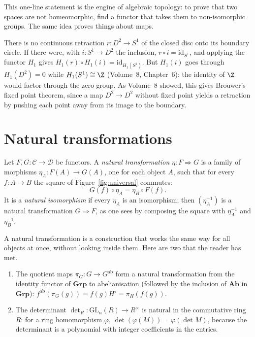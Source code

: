 This one-line statement is the engine of algebraic topology: to prove that two spaces are not homeomorphic, find a functor that takes them to non-isomorphic groups. The same idea
proves things about maps.

\begin{example}\label{ex:brouwer}
There is no continuous retraction $r\colon D^2\to S^1$ of the closed disc onto its boundary circle. If there were, with $i\colon S^1\to D^2$ the inclusion, $r\circ i=\mathrm{id}_{S^1}$, and applying
the functor $H_1$ gives $H_1(r)\circ H_1(i)=\mathrm{id}_{H_1(S^1)}$. But $H_1(i)$ goes through $H_1(D^2)=0$ while $H_1(S^1)\cong\Z$ (Volume~8, Chapter~6): the identity of $\Z$ would factor through
the zero group. As Volume~8 showed, this gives Brouwer's fixed point theorem, since a map $D^2\to D^2$ without fixed point yields a retraction by pushing each point away from its image to the boundary.
\end{example}

\section{Natural transformations}

\begin{definition}\label{def:nat}
Let $F,G\colon\mathcal C\to\mathcal D$ be functors. A \emph{natural transformation} $\eta\colon F\Rightarrow G$ is a family of morphisms $\eta_A\colon F(A)\to G(A)$, one for each object $A$, such that
for every $f\colon A\to B$ the square of Figure~\ref{fig:universal} commutes:
\[G(f)\circ\eta_A=\eta_B\circ F(f).\]
It is a \emph{natural isomorphism} if every $\eta_A$ is an isomorphism; then $(\eta_A^{-1})$ is a natural transformation $G\Rightarrow F$, as one sees by composing the square with $\eta_A^{-1}$ and $\eta_B^{-1}$.
\end{definition}

A natural transformation is a construction that works the same way for all objects at once, without looking inside them. Here are two that the reader has met.

\begin{example}\label{ex:nattrans}
\leavevmode
\begin{enumerate}[label=(\alph*)]
\item The quotient maps $\pi_G\colon G\to G^{\mathrm{ab}}$ form a natural transformation from the identity functor of $\mathbf{Grp}$ to abelianisation (followed by the inclusion of $\mathbf{Ab}$ in
$\mathbf{Grp}$): $f^{\mathrm{ab}}(\pi_G(g))=f(g)H'=\pi_H(f(g))$.
\item The determinant $\det_R\colon\mathrm{GL}_n(R)\to R^\times$ is natural in the commutative ring $R$: for a ring homomorphism $\varphi$, $\det(\varphi(M))=\varphi(\det M)$, because the
determinant is a polynomial with integer coefficients in the entries.
\end{enumerate}
\end{example}

